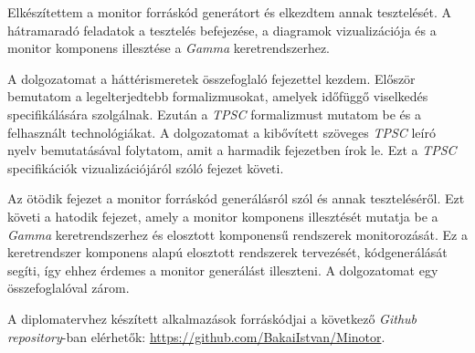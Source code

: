 Elkészítettem a monitor forráskód generátort és elkezdtem annak tesztelését.
A hátramaradó feladatok a tesztelés befejezése, a diagramok vizualizációja és a monitor komponens illesztése a \textit{Gamma} keretrendszerhez.

A dolgozatomat a háttérismeretek összefoglaló fejezettel kezdem.
Először bemutatom a legelterjedtebb formalizmusokat, amelyek időfüggő viselkedés specifikálására szolgálnak.
Ezután a \textit{TPSC} formalizmust mutatom be és a felhasznált technológiákat.
A dolgozatomat a kibővített szöveges \textit{TPSC} leíró nyelv bemutatásával folytatom, amit a harmadik fejezetben írok le.
Ezt a \textit{TPSC} specifikációk vizualizációjáról szóló fejezet követi.

Az ötödik fejezet a monitor forráskód generálásról szól és annak teszteléséről.
Ezt követi a hatodik fejezet, amely a monitor komponens illesztését mutatja be a \textit{Gamma} keretrendszerhez és elosztott komponensű rendszerek monitorozását.
Ez a keretrendszer komponens alapú elosztott rendszerek tervezését, kódgenerálását segíti, így ehhez érdemes a monitor generálást illeszteni.
A dolgozatomat egy összefoglalóval zárom.

A diplomatervhez készített alkalmazások forráskódjai a következő \textit{Github} \textit{repository}-ban elérhetők:
\url{https://github.com/BakaiIstvan/Minotor}.